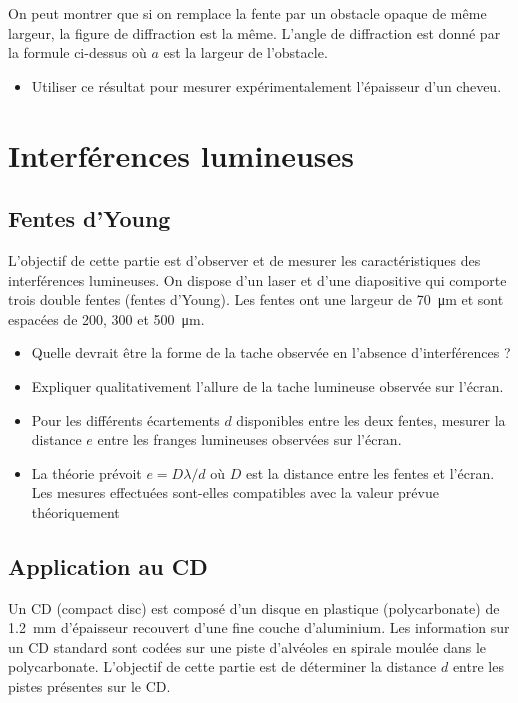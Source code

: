 \documentclass{tp}
\begin{document}
On peut montrer que si on remplace la fente par un obstacle opaque de même largeur, la figure de diffraction est la même. L'angle de diffraction est donné par la formule ci-dessus où $a$ est la largeur de l'obstacle.

\begin{itemize}
  \item Utiliser ce résultat pour mesurer expérimentalement l'épaisseur d'un cheveu.
\end{itemize}

\section{Interférences lumineuses}
\subsection{Fentes d'Young}%
\label{sub:fentes_d_young}

L'objectif de cette partie est d'observer et de mesurer les caractéristiques des interférences lumineuses. On dispose d'un laser et d'une diapositive qui comporte trois double fentes (fentes d'Young). Les fentes ont une largeur de \SI{70}{\micro\meter} et sont espacées de 200, 300 et \SI{500}{\micro\meter}.
\begin{itemize}
\item Quelle devrait être la forme de la tache observée en l'absence d'interférences ?
\item Expliquer qualitativement l'allure de la tache lumineuse observée sur l'écran.
\item Pour les différents écartements $d$ disponibles entre les deux fentes, mesurer la distance $e$ entre les franges lumineuses observées sur l'écran. 
\item La théorie prévoit $e=D\lambda/d$ où $D$ est la distance entre les fentes et l'écran. Les mesures effectuées sont-elles compatibles avec la valeur prévue théoriquement
\end{itemize}

\subsection{Application au CD}%
\label{sub:application_au_cd}
Un CD (compact disc) est composé d'un disque en plastique (polycarbonate) de \SI{1.2}{mm} d'épaisseur recouvert d'une fine couche d'aluminium. Les information sur un CD standard sont codées sur une piste d'alvéoles en spirale moulée dans le polycarbonate. L'objectif de cette partie est de déterminer la distance $d$ entre les pistes présentes sur le CD.
\end{document}

